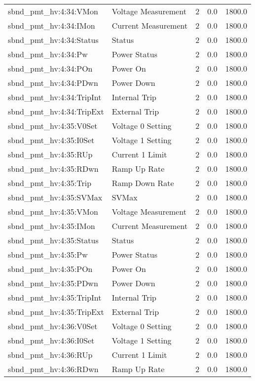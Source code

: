 \begin{center}
\begin{longtable}{l | l l l l }
sbnd\_pmt\_hv:4:34:VMon & Voltage Measurement & 2 & 0.0 & 1800.0\\ 
sbnd\_pmt\_hv:4:34:IMon & Current Measurement & 2 & 0.0 & 1800.0\\ 
sbnd\_pmt\_hv:4:34:Status & Status & 2 & 0.0 & 1800.0\\ 
sbnd\_pmt\_hv:4:34:Pw & Power Status & 2 & 0.0 & 1800.0\\ 
sbnd\_pmt\_hv:4:34:POn & Power On & 2 & 0.0 & 1800.0\\ 
sbnd\_pmt\_hv:4:34:PDwn & Power Down & 2 & 0.0 & 1800.0\\ 
sbnd\_pmt\_hv:4:34:TripInt & Internal Trip & 2 & 0.0 & 1800.0\\ 
sbnd\_pmt\_hv:4:34:TripExt & External Trip & 2 & 0.0 & 1800.0\\ 
sbnd\_pmt\_hv:4:35:V0Set & Voltage 0 Setting & 2 & 0.0 & 1800.0\\ 
sbnd\_pmt\_hv:4:35:I0Set & Voltage 1 Setting & 2 & 0.0 & 1800.0\\ 
sbnd\_pmt\_hv:4:35:RUp & Current 1 Limit & 2 & 0.0 & 1800.0\\ 
sbnd\_pmt\_hv:4:35:RDwn & Ramp Up Rate & 2 & 0.0 & 1800.0\\ 
sbnd\_pmt\_hv:4:35:Trip & Ramp Down Rate & 2 & 0.0 & 1800.0\\ 
sbnd\_pmt\_hv:4:35:SVMax & SVMax & 2 & 0.0 & 1800.0\\ 
sbnd\_pmt\_hv:4:35:VMon & Voltage Measurement & 2 & 0.0 & 1800.0\\ 
sbnd\_pmt\_hv:4:35:IMon & Current Measurement & 2 & 0.0 & 1800.0\\ 
sbnd\_pmt\_hv:4:35:Status & Status & 2 & 0.0 & 1800.0\\ 
sbnd\_pmt\_hv:4:35:Pw & Power Status & 2 & 0.0 & 1800.0\\ 
sbnd\_pmt\_hv:4:35:POn & Power On & 2 & 0.0 & 1800.0\\ 
sbnd\_pmt\_hv:4:35:PDwn & Power Down & 2 & 0.0 & 1800.0\\ 
sbnd\_pmt\_hv:4:35:TripInt & Internal Trip & 2 & 0.0 & 1800.0\\ 
sbnd\_pmt\_hv:4:35:TripExt & External Trip & 2 & 0.0 & 1800.0\\ 
sbnd\_pmt\_hv:4:36:V0Set & Voltage 0 Setting & 2 & 0.0 & 1800.0\\ 
sbnd\_pmt\_hv:4:36:I0Set & Voltage 1 Setting & 2 & 0.0 & 1800.0\\ 
sbnd\_pmt\_hv:4:36:RUp & Current 1 Limit & 2 & 0.0 & 1800.0\\ 
sbnd\_pmt\_hv:4:36:RDwn & Ramp Up Rate & 2 & 0.0 & 1800.0\\ 

\end{longtable}
\end{center}
